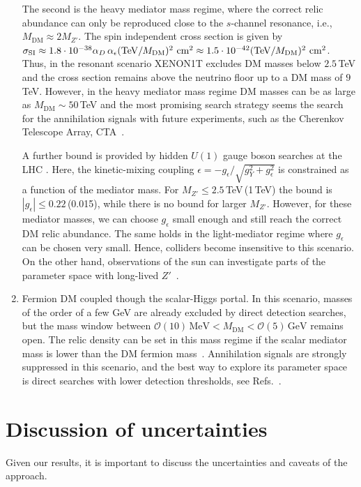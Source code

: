\documentclass[aps,prd,twocolumn,preprintnumbers,superscriptaddress,nobibnotes,floatfix,longbibliography]{revtex4-1}
\newcommand{\MDM}{M_{\text{DM}}}
\begin{document}
\begin{enumerate}
The second is the heavy mediator mass regime, where the correct relic abundance can only be reproduced close to the $s$-channel resonance, i.e., $\MDM \approx 2 M_{Z'}$. The spin independent cross section is given by $\sigma_{\rm SI} \approx 1.8 \cdot10^{-38} \alpha_D \, \alpha_\epsilon (\text{TeV}/\MDM)^2 \text{ cm}^2 \approx  1.5 \cdot10^{-42}  (\text{TeV}/\MDM)^2 \text{ cm}^2 $. Thus, in the resonant scenario XENON1T excludes DM masses below $2.5$\,TeV and the cross section remains above the neutrino floor up to a DM mass of $9$\,TeV.
However, in the heavy mediator mass regime DM masses can be as large as $\MDM \sim 50$\,TeV and the most promising search strategy seems the search for the annihilation signals with future experiments, such as the Cherenkov Telescope Array, CTA~\cite{1008.3703}.

A further bound is provided by hidden $U(1)$ gauge boson searches at the LHC \cite{1212.3620}.
Here, the kinetic-mixing coupling $\epsilon=-g_\epsilon/\sqrt{g_Y^2+g_\epsilon^2}$ is constrained as a function of the mediator mass.
For $M_{Z'}\leq2.5$\,TeV\,(1\,TeV) the bound is $|g_\epsilon|\leq 0.22$\,(0.015), while there is no bound for larger $M_{Z'}$.
However, for these mediator masses, we can choose $g_\epsilon$ small enough and still reach the correct DM relic abundance.
The same holds in the light-mediator regime where $g_\epsilon$ can be chosen very small.
Hence, colliders become insensitive to this scenario. On the other hand, observations of the sun can investigate parts of the parameter space with long-lived $Z'$~\cite{1808.05624}.

\item Fermion DM coupled though the scalar-Higgs portal. In this scenario, masses of the order of a few GeV are already excluded by direct detection searches, but the mass window between $\mathcal{O}(10)\,\text{MeV} < \MDM < \mathcal{O}(5)\,\text{GeV}$ remains open. The relic density can be set in this mass regime if the scalar mediator mass is lower than the DM fermion mass~\cite{1909.08632}. Annihilation signals are strongly suppressed in this scenario, and the best way to explore its parameter space is direct searches with lower detection thresholds, see Refs.~\cite{1708.08929,1810.06283}.  
\end{enumerate}


\section{Discussion of uncertainties}
\label{sec:discussion}
Given our results, it is important to discuss the uncertainties and caveats of the approach.
\end{document}
